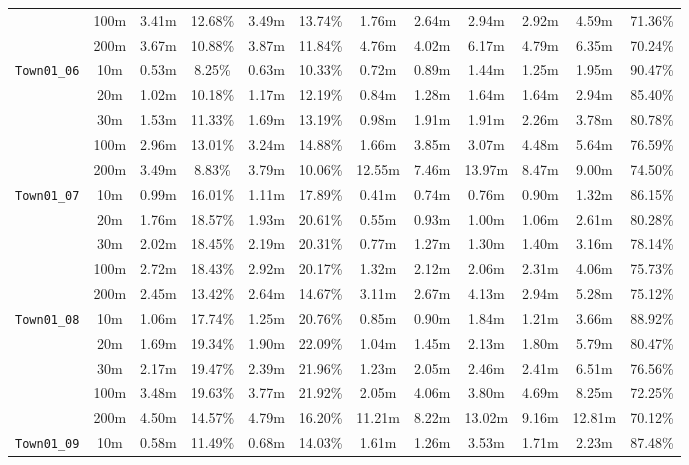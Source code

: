 \begin{table}
{\begin{tabular}{@{}cccccccccccc@{}}
      & 100m & 3.41m & 12.68\% & 3.49m & 13.74\% & 1.76m & 2.64m & 2.94m & 2.92m & 4.59m & 71.36\% \\
      & 200m & 3.67m & 10.88\% & 3.87m & 11.84\% & 4.76m & 4.02m & 6.17m & 4.79m & 6.35m & 70.24\% \\
      \midrule
      \multirow{5}{*}{\Verb|Town01_06|} & 10m & 0.53m & 8.25\% & 0.63m & 10.33\% & 0.72m & 0.89m & 1.44m & 1.25m & 1.95m & 90.47\% \\
      & 20m & 1.02m & 10.18\% & 1.17m & 12.19\% & 0.84m & 1.28m & 1.64m & 1.64m & 2.94m & 85.40\% \\
      & 30m & 1.53m & 11.33\% & 1.69m & 13.19\% & 0.98m & 1.91m & 1.91m & 2.26m & 3.78m & 80.78\% \\
      & 100m & 2.96m & 13.01\% & 3.24m & 14.88\% & 1.66m & 3.85m & 3.07m & 4.48m & 5.64m & 76.59\% \\
      & 200m & 3.49m & 8.83\% & 3.79m & 10.06\% & 12.55m & 7.46m & 13.97m & 8.47m & 9.00m & 74.50\% \\
      \midrule
      \multirow{5}{*}{\Verb|Town01_07|} & 10m & 0.99m & 16.01\% & 1.11m & 17.89\% & 0.41m & 0.74m & 0.76m & 0.90m & 1.32m & 86.15\% \\
      & 20m & 1.76m & 18.57\% & 1.93m & 20.61\% & 0.55m & 0.93m & 1.00m & 1.06m & 2.61m & 80.28\% \\
      & 30m & 2.02m & 18.45\% & 2.19m & 20.31\% & 0.77m & 1.27m & 1.30m & 1.40m & 3.16m & 78.14\% \\
      & 100m & 2.72m & 18.43\% & 2.92m & 20.17\% & 1.32m & 2.12m & 2.06m & 2.31m & 4.06m & 75.73\% \\
      & 200m & 2.45m & 13.42\% & 2.64m & 14.67\% & 3.11m & 2.67m & 4.13m & 2.94m & 5.28m & 75.12\% \\
      \midrule
      \multirow{5}{*}{\Verb|Town01_08|} & 10m & 1.06m & 17.74\% & 1.25m & 20.76\% & 0.85m & 0.90m & 1.84m & 1.21m & 3.66m & 88.92\% \\
      & 20m & 1.69m & 19.34\% & 1.90m & 22.09\% & 1.04m & 1.45m & 2.13m & 1.80m & 5.79m & 80.47\% \\
      & 30m & 2.17m & 19.47\% & 2.39m & 21.96\% & 1.23m & 2.05m & 2.46m & 2.41m & 6.51m & 76.56\% \\
      & 100m & 3.48m & 19.63\% & 3.77m & 21.92\% & 2.05m & 4.06m & 3.80m & 4.69m & 8.25m & 72.25\% \\
      & 200m & 4.50m & 14.57\% & 4.79m & 16.20\% & 11.21m & 8.22m & 13.02m & 9.16m & 12.81m & 70.12\% \\
      \midrule
      \multirow{5}{*}{\Verb|Town01_09|} & 10m & 0.58m & 11.49\% & 0.68m & 14.03\% & 1.61m & 1.26m & 3.53m & 1.71m & 2.23m & 87.48\% \\

\end{tabular}}
\end{table}
